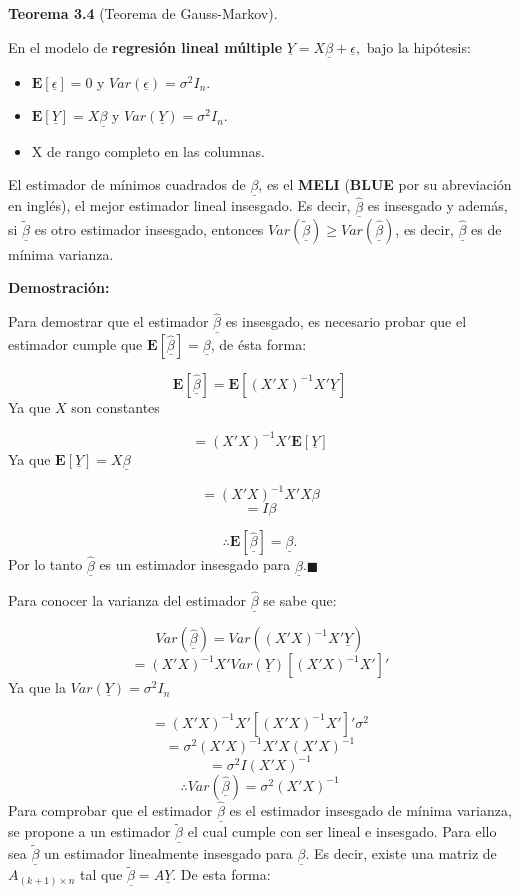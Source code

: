 \documentclass[
  a4paper,
  oneside,
  openany]{book}
\begin{document}
\textbf{Teorema 3.4} (Teorema de Gauss-Markov).

En el modelo de \textbf{regresión lineal múltiple} \(\underline{Y}=X \underline{\beta}+ \underline{\epsilon},\) bajo la hipótesis:

\begin{itemize}
\item
  \(\mathbf{E}[\underline{\epsilon}]=0\) y \(Var(\underline{\epsilon})=\sigma^2I_{n}.\)
\item
  \(\mathbf{E}[\underline{Y}]=X \underline{\beta}\) y \(Var(\underline{Y})=\sigma^2I_{n}.\)
\item
  X de rango completo en las columnas.
\end{itemize}

El estimador de mínimos cuadrados de \(\underline{\beta}\), es el \textbf{MELI} (\textbf{BLUE} por su abreviación en inglés), el mejor estimador lineal insesgado. Es decir, \(\underline{\hat{\beta}}\) es insesgado y además, si \(\underline{\tilde{\beta}}\) es otro estimador insesgado, entonces \(Var(\underline{\tilde{\beta}})\geq Var(\underline{\hat{\beta}})\), es decir, \(\underline{\hat{\beta}}\) es de mínima varianza.

\textbf{Demostración:}

Para demostrar que el estimador \(\underline{\hat{\beta}}\) es insesgado, es necesario probar que el estimador cumple que \(\mathbf{E}[\underline{\hat{\beta}}]=\underline{\beta}\), de ésta forma:

\[\mathbf{E}[\underline{\hat{\beta}}]=\mathbf{E}[(X'X)^{-1}X'\underline{Y}]\]
Ya que \(X\) son constantes

\[=(X'X)^{-1}X'\mathbf{E}[\underline{Y}]\]
Ya que \(\mathbf{E}[\underline{Y}]=X\underline{\beta}\)

\[=(X'X)^{-1}X'X\beta\]
\[=I\beta\]

\[\therefore \mathbf{E}[\underline{\hat{\beta}}]=\underline{\beta}.\]
Por lo tanto \(\underline{\hat{\beta}}\) es un estimador insesgado para \(\underline{\beta}\).\(\blacksquare\)

Para conocer la varianza del estimador \(\underline{\hat{\beta}}\) se sabe que:

\[Var(\underline{\hat{\beta}})=Var\left( (X'X)^{-1}X'\underline{Y}\right)\]
\[=(X'X)^{-1}X'Var(\underline{Y})[(X'X)^{-1}X']'\]
Ya que la \(Var(\underline{Y})=\sigma^2I_{n}\)

\[=(X'X)^{-1}X'[(X'X)^{-1}X']'\sigma^2\]
\[=\sigma^2(X'X)^{-1}X'X(X'X)^{-1}\]
\[
=\sigma^2I(X'X)^{-1}
\]
\[
\therefore Var(\underline{\hat{\beta}})=\sigma^2(X'X)^{-1}
\]
Para comprobar que el estimador \(\underline{\hat{\beta}}\) es el estimador insesgado de mínima varianza, se propone a un estimador \(\underline{\tilde{\beta}}\) el cual cumple con ser lineal e insesgado. Para ello sea \(\underline{\tilde{\beta}}\) un estimador linealmente insesgado para \(\underline{\beta}\). Es decir, existe una matriz de \(A_{(k+1)\times n}\) tal que \(\underline{\tilde{\beta}}=A \underline{Y}.\)
De esta forma:
\end{document}
